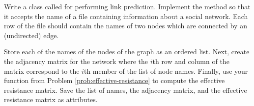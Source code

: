 \begin{problem}
Write a class called  for performing link prediction.
Implement the  method so that it accepts the name of a  file containing information about a social network.
Each row of the file should contain the names of two nodes which are connected by an (undirected) edge.

Store each of the names of the nodes of the graph as an ordered list.
Next, create the adjacency matrix for the network where the $i$th row and column of the matrix correspond to the $i$th member of the list of node names.
Finally, use your function from Problem \ref{prob:effective-resistance} to compute the effective resistance matrix.
Save the list of names, the adjacency matrix, and the effective resistance matrix as attributes.
\end{problem}

